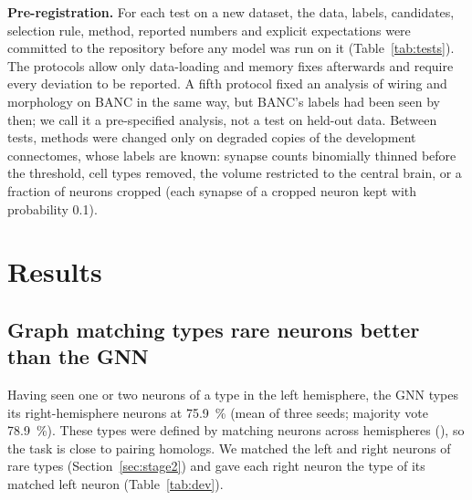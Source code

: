 \documentclass[11pt,a4paper]{article}
\begin{document}
\textbf{Pre-registration.} For each test on a new dataset, the data, labels, candidates, selection rule, method, reported numbers and explicit expectations were committed to the repository before any model was run on it (Table~\ref{tab:tests}). The protocols allow only data-loading and memory fixes afterwards and require every deviation to be reported. A fifth protocol fixed an analysis of wiring and morphology on BANC in the same way, but BANC's labels had been seen by then; we call it a pre-specified analysis, not a test on held-out data. Between tests, methods were changed only on degraded copies of the development connectomes, whose labels are known: synapse counts binomially thinned before the threshold, cell types removed, the volume restricted to the central brain, or a fraction of neurons cropped (each synapse of a cropped neuron kept with probability 0.1).

\section{Results}

\subsection{Graph matching types rare neurons better than the GNN}\label{sec:res-dev}

Having seen one or two neurons of a type in the left hemisphere, the GNN types its right-hemisphere neurons at 75.9~\% (mean of three seeds; majority vote 78.9~\%). These types were defined by matching neurons across hemispheres (\citealp{schlegel2024}), so the task is close to pairing homologs. We matched the left and right neurons of rare types (Section~\ref{sec:stage2}) and gave each right neuron the type of its matched left neuron (Table~\ref{tab:dev}).
\end{document}
